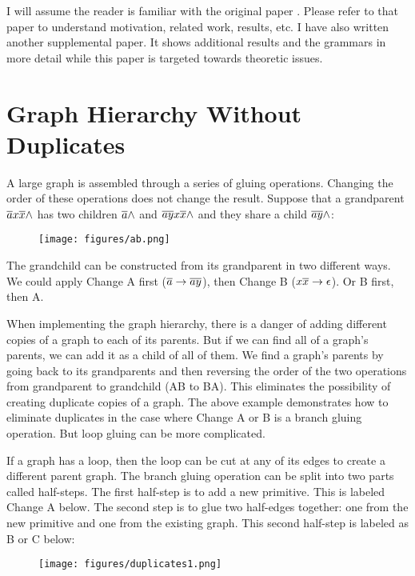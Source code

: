 \documentclass[acmtog]{acmart}
\begin{document}
I will assume the reader is familiar with the original paper \cite{siggraph}. Please refer
to that paper to understand motivation, related work, results, etc. I have also
written another supplemental paper. It shows additional results and
the grammars in more detail while this paper is targeted towards theoretic
issues.

\section{Graph Hierarchy Without Duplicates}
\label{Removing Duplicates}

A large graph is assembled through a series of gluing operations. Changing the order
of these operations does not change the result. Suppose that a grandparent $\overline{a}x\overline{x} {\wedge}$
has two children $\overline{a}{\wedge}$ and $\overline{ay}x\overline{x} {\wedge}$ and they share a child $\overline{a}\overline{y} {\wedge}$:

\begin{figure}[H]
\centering
\texttt{[image: figures/ab.png]}
\end{figure}

The grandchild can be constructed from its grandparent in two different ways. 
We could apply Change A first ($\overline{a} \rightarrow \overline{ay}$), then Change B
($x\overline{x} \rightarrow \epsilon$). Or B first, then A.

When implementing the graph hierarchy, there is a danger of adding different 
copies of a graph to each of its parents. But if we can find all of a graph's 
parents, we can add it as a child of all of them. We find a graph's parents 
by going back to its grandparents and then reversing the order of the two 
operations from grandparent to grandchild (AB to BA). This eliminates the 
possibility of creating duplicate copies of a graph. The above example 
demonstrates how to eliminate duplicates in the case where Change A or B is a
branch gluing operation. But loop gluing can be more complicated.

If a graph has a loop, then the loop can be cut at any of its edges to create 
a different parent graph. The branch gluing operation can be split into two 
parts called half-steps. The first half-step is to add a new primitive. This 
is labeled Change A below. The second step is to glue two half-edges 
together: one from the new primitive and one from the existing graph. This 
second half-step is labeled as B or C below:

\begin{figure}[H]
\centering
\texttt{[image: figures/duplicates1.png]}
\end{figure}
\end{document}
